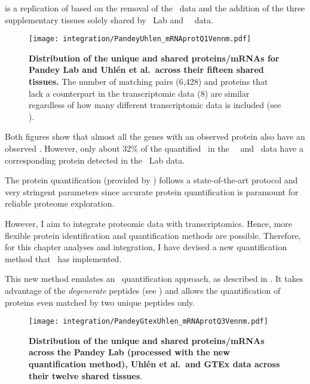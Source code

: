  is a replication of 
based on the removal of the \gtex\ data
and the addition of the three supplementary tissues solely shared
by \pandey\ Lab and \uhlen\ \etal\ data.

\begin{figure}[!htb]
    \texttt{[image: integration/PandeyUhlen\_mRNAprotQ1Vennm.pdf]}\centering
    \vspace{-3.5mm}
    \caption[Distribution of the unique and shared proteins/mRNAs for Pandey Lab
    and Uhlén et al.\ across fifteen tissues.]{%
    \label{fig:PU_vennQ1}\textbf{Distribution of the unique and shared proteins/mRNAs
    for Pandey Lab and Uhlén et al.\ across their fifteen shared tissues.}
    The number of matching pairs (6,428) and proteins that lack a counterpart in
    the transcriptomic data (8) are similar regardless of how many different
    transcriptomic data is included (see ).}
\end{figure}

Both figures show that
almost all the genes with an observed protein
also have an observed \mRNA{}.
However, only about 32\% of the quantified \mRNAs\
in the \uhlen\ \etal\ and \gtex\ data
have a corresponding protein detected in the \pandey\ Lab data.\mybr\

The protein quantification (provided by \james) follows
a state-of-the-art protocol and very stringent parameters
since accurate protein quantification is paramount for reliable proteome exploration.

However, I aim to integrate proteomic data with transcriptomics.
Hence, more flexible protein identification and quantification methods are possible.
Therefore, for this chapter analyses and integration,
I have devised a new quantification method that \james\ has implemented.%

This new method emulates an \Rnaseq\ quantification approach,
as described in .
It takes advantage of the \emph{degenerate} peptides (see )
and allows the quantification of proteins even matched by two unique peptides only.%

\begin{figure}[!ht]
    \texttt{[image: integration/PandeyGtexUhlen\_mRNAprotQ3Vennm.pdf]}\centering
    \vspace{-4mm}
    \caption[Distribution of the unique and shared proteins/mRNAs
    across the three datasets and twelve tissues
    (with the new protein quantification method)]{\label{fig:PGU_venQ3}%
    \textbf{Distribution of the unique and shared proteins/mRNAs
    across the Pandey Lab (processed with the new quantification method),
    Uhlén et al.\ and GTEx data across their twelve shared tissues}.
    }
\end{figure}

